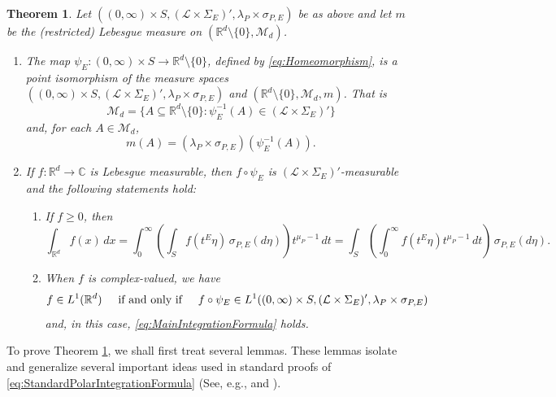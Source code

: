 \documentclass[11pt]{article}
\newtheorem{theorem}{Theorem}[section]
\begin{document}
\begin{theorem}\label{thm:MainIntegrationFormula}
Let $((0,\infty)\times S,(\mathcal{L}\times\Sigma_E)',\lambda_P\times\sigma_{P,E})$ be as above and let $m$ be the (restricted) Lebesgue measure on $(\mathbb{R}^d\setminus\{0\},\mathcal{M}_d)$.
\begin{enumerate}
\item\label{item:MainIntegrationFormula1} The map $\psi_E: (0,\infty)\times S\to\mathbb{R}^d\setminus\{0\}$, defined by \eqref{eq:Homeomorphism}, is a point isomorphism of the measure spaces $((0,\infty)\times S,(\mathcal{L}\times\Sigma_E)',\lambda_P\times\sigma_{P,E})$ and $(\mathbb{R}^d\setminus\{0\},\mathcal{M}_d,m)$. That is
\begin{equation*}
\mathcal{M}_d=\{A\subseteq \mathbb{R}^d\setminus\{0\}:\psi_E^{-1}(A)\in(\mathcal{L}\times\Sigma_E)'\}
\end{equation*}
and, for each $A\in\mathcal{M}_d$,
\begin{equation*}
m(A)=(\lambda_P\times\sigma_{P,E})(\psi_E^{-1}(A)).
\end{equation*}
\item\label{item:MainintegrationFormula2} If $f:\mathbb{R}^d\to\mathbb{C}$ is Lebesgue measurable, then $f\circ \psi_E$ is $(\mathcal{L}\times\Sigma_E)'$-measurable and the following statements hold:
\begin{enumerate}
\item If $f\geq 0$, then
\begin{equation}\label{eq:MainIntegrationFormula}
\int_{\mathbb{R}^d}f(x)\,dx=\int_0^\infty\left(\int_S f(t^E\eta)\,\sigma_{P,E}(d\eta)\right)t^{\mu_P-1}\,dt=\int_S\left(\int_0^\infty f(t^E\eta)t^{\mu_P-1}\,dt\right)\,\sigma_{P,E}(d\eta).
\end{equation}
\item When $f$ is complex-valued, we have 
\begin{equation*}f\in L^1(\mathbb{R}^d)\hspace{.5cm}\mbox{if and only if}\hspace{0.5cm}f\circ\psi_E\in L^1((0,\infty)\times S,(\mathcal{L}\times \Sigma_E)',\lambda_P\times\sigma_{P,E})
\end{equation*}
and, in this case, \eqref{eq:MainIntegrationFormula} holds.
\end{enumerate}
\end{enumerate}
\end{theorem}

\noindent To prove Theorem \ref{thm:MainIntegrationFormula}, we shall first treat several lemmas. These lemmas isolate and generalize several important ideas used in standard proofs of \eqref{eq:StandardPolarIntegrationFormula} (See, e.g., \cite{Folland1984} and \cite{Stein2005}). 
\end{document}
